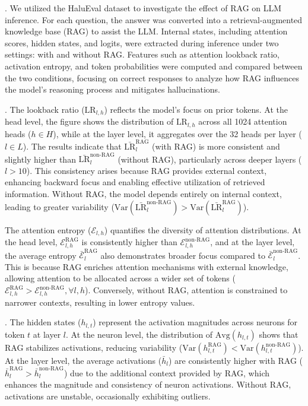 .
We utilized the HaluEval dataset to investigate the effect of RAG on LLM inference. For each question, the answer was converted into a retrieval-augmented knowledge base (RAG) to assist the LLM. Internal states, including attention scores, hidden states, and logits, were extracted during inference under two settings: with and without RAG. Features such as attention lookback ratio, activation entropy, and token probabilities were computed and compared between the two conditions, focusing on correct responses to analyze how RAG influences the model’s reasoning process and mitigates hallucinations.


.  
The lookback ratio (\(\text{LR}_{l,h}\)) reflects the model's focus on prior tokens. At the head level, the figure shows the distribution of \(\text{LR}_{l,h}\) across all 1024 attention heads (\(h \in H\)), while at the layer level, it aggregates over the 32 heads per layer (\(l \in L\)). The results indicate that \(\bar{\text{LR}}_l^{\text{RAG}}\) (with RAG) is more consistent and slightly higher than \(\bar{\text{LR}}_l^{\text{non-RAG}}\) (without RAG), particularly across deeper layers (\(l > 10\)). This consistency arises because RAG provides external context, enhancing backward focus and enabling effective utilization of retrieved information. Without RAG, the model depends entirely on internal context, leading to greater variability (\(\text{Var}(\bar{\text{LR}}_l^{\text{non-RAG}}) > \text{Var}(\bar{\text{LR}}_l^{\text{RAG}})\)).

The attention entropy (\(\mathcal{E}_{l,h}\)) quantifies the diversity of attention distributions. At the head level, \(\mathcal{E}_{l,h}^{\text{RAG}}\) is consistently higher than \(\mathcal{E}_{l,h}^{\text{non-RAG}}\), and at the layer level, the average entropy \(\bar{\mathcal{E}}_l^{\text{RAG}}\) also demonstrates broader focus compared to \(\bar{\mathcal{E}}_l^{\text{non-RAG}}\). This is because RAG enriches attention mechanisms with external knowledge, allowing attention to be allocated across a wider set of tokens (\(\mathcal{E}_{l,h}^{\text{RAG}} > \mathcal{E}_{l,h}^{\text{non-RAG}}, \forall l,h\)). Conversely, without RAG, attention is constrained to narrower contexts, resulting in lower entropy values.


.  
The hidden states (\(h_{l,t}\)) represent the activation magnitudes across neurons for token \(t\) at layer \(l\). At the neuron level, the distribution of \(\text{Avg}(h_{l,t})\) shows that RAG stabilizes activations, reducing variability (\(\text{Var}(h_{l,t}^{\text{RAG}}) < \text{Var}(h_{l,t}^{\text{non-RAG}})\)). At the layer level, the average activations (\(\bar{h}_l\)) are consistently higher with RAG (\(\bar{h}_l^{\text{RAG}} > \bar{h}_l^{\text{non-RAG}}\)) due to the additional context provided by RAG, which enhances the magnitude and consistency of neuron activations. Without RAG, activations are unstable, occasionally exhibiting outliers.

